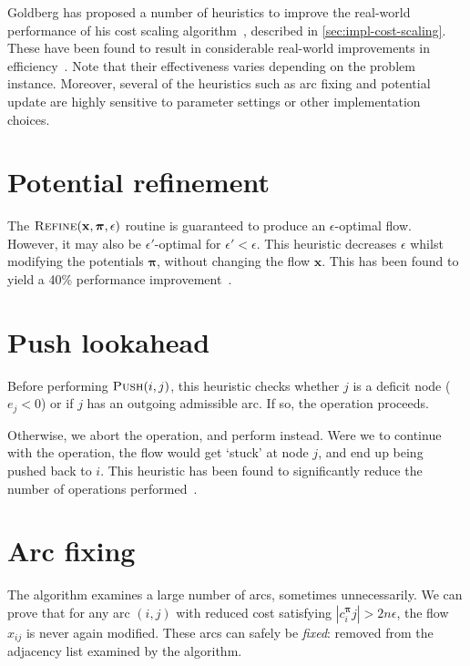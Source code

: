 Goldberg has proposed a number of heuristics to improve the real-world performance of his cost scaling algorithm~\cite{Goldberg:1997}, described in \cref{sec:impl-cost-scaling}. These have been found to result in considerable real-world improvements in efficiency~\cite{Bunnagel:1998,KiralyKovacs:2012}. Note that their effectiveness varies depending on the problem instance. Moreover, several of the heuristics such as arc fixing and potential update are highly sensitive to parameter settings or other implementation choices.

\section{Potential refinement} \label{appendix:csheuristics-potential-refinement}
The $\textproc{Refine}(\mathbf{x},\boldsymbol{\pi},\epsilon)$ routine is guaranteed to produce an $\epsilon$-optimal flow. However, it may also be $\epsilon'$-optimal for $\epsilon' < \epsilon$. This heuristic decreases $\epsilon$ whilst modifying the potentials $\boldsymbol{\pi}$, without changing the flow $\mathbf{x}$. This has been found to yield a 40\% performance improvement~\cite{Bunnagel:1998}.

\section{Push lookahead}
Before performing $\textproc{Push}(i,j)$, this heuristic checks whether $j$ is a deficit node ($e_j < 0$) or if $j$ has an outgoing admissible arc. If so, the  operation proceeds.

Otherwise, we abort the  operation, and perform  instead. Were we to continue with the  operation, the flow would get `stuck' at node $j$, and end up being pushed back to $i$. This heuristic has been found to significantly reduce the number of  operations performed~\cite{Goldberg:1997}.

\section{Arc fixing}
The algorithm examines a large number of arcs, sometimes unnecessarily. We can prove that for any arc $(i,j)$ with reduced cost satisfying $\left|c^{\boldsymbol{\pi}}_ij\right| > 2n\epsilon$, the flow $x_{ij}$ is never again modified. These arcs can safely be \emph{fixed}: removed from the adjacency list examined by the algorithm. 

